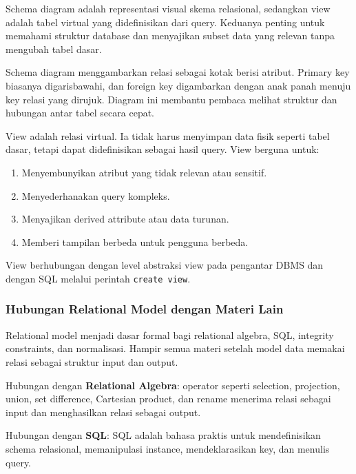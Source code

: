 \begin{jawab}
Schema diagram adalah representasi visual skema relasional, sedangkan view adalah tabel virtual yang didefinisikan dari query. Keduanya penting untuk memahami struktur database dan menyajikan subset data yang relevan tanpa mengubah tabel dasar.
\end{jawab}

Schema diagram menggambarkan relasi sebagai kotak berisi atribut. Primary key biasanya digarisbawahi, dan foreign key digambarkan dengan anak panah menuju key relasi yang dirujuk. Diagram ini membantu pembaca melihat struktur dan hubungan antar tabel secara cepat.

View adalah relasi virtual. Ia tidak harus menyimpan data fisik seperti tabel dasar, tetapi dapat didefinisikan sebagai hasil query. View berguna untuk:
\begin{enumerate}
    \item Menyembunyikan atribut yang tidak relevan atau sensitif.
    \item Menyederhanakan query kompleks.
    \item Menyajikan derived attribute atau data turunan.
    \item Memberi tampilan berbeda untuk pengguna berbeda.
\end{enumerate}

View berhubungan dengan level abstraksi view pada pengantar DBMS dan dengan SQL melalui perintah \texttt{create view}.

\subsubsection{Hubungan Relational Model dengan Materi Lain}

\begin{jawab}
Relational model menjadi dasar formal bagi relational algebra, SQL, integrity constraints, dan normalisasi. Hampir semua materi setelah model data memakai relasi sebagai struktur input dan output.
\end{jawab}

Hubungan dengan \textbf{Relational Algebra}: operator seperti selection, projection, union, set difference, Cartesian product, dan rename menerima relasi sebagai input dan menghasilkan relasi sebagai output.

Hubungan dengan \textbf{SQL}: SQL adalah bahasa praktis untuk mendefinisikan schema relasional, memanipulasi instance, mendeklarasikan key, dan menulis query.

